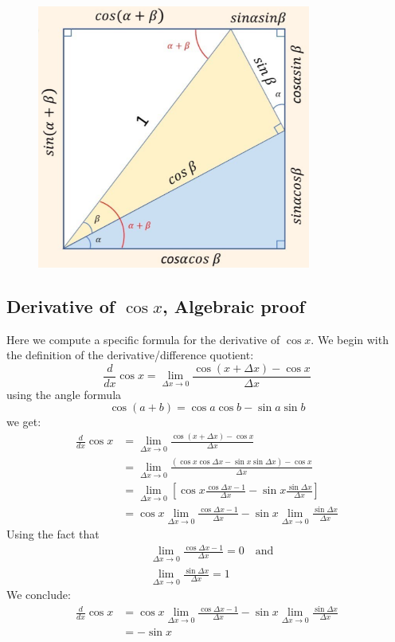 \documentclass{report}
\begin{document}
\begin{figure}[h]
\includegraphics[width=9cm]{Capture6}
\centering
\end{figure}
\newpage

\subsection{Derivative of $\cos x$, Algebraic proof} %
Here we compute a specific formula for the derivative of $\cos x$. We begin with the
definition of the derivative/difference quotient:
\begin{equation*}
\frac{d}{dx}\cos x=\lim_{\Delta x\to 0}\frac{\cos(x+\Delta x)-\cos x}{\Delta x}
\end{equation*}
using the angle formula
\begin{equation*}
\cos(a+b)=\cos a\cos b-\sin a\sin b
\end{equation*}
we get:
\begin{align*}
\frac{d}{dx}\cos x&=\lim_{\Delta x\to 0}\frac{\cos(x+\Delta x)-\cos x}{\Delta x}\\
&=\lim_{\Delta x\to 0}\frac{(\cos x\cos\Delta x-\sin x\sin\Delta x)-\cos x}{\Delta x}\\
&=\lim_{\Delta x\to 0}\left[\cos x\frac{\cos\Delta x-1}{\Delta x}
-\sin x\frac{\sin\Delta x}{\Delta x}\right]\\
&=\cos x\lim_{\Delta x\to 0}\frac{\cos\Delta x-1}{\Delta x}
-\sin x\lim_{\Delta x\to 0}\frac{\sin\Delta x}{\Delta x}
\end{align*}
Using the fact that
\begin{align*}
&\lim_{\Delta x\to 0}\frac{\cos\Delta x-1}{\Delta x}=0\quad\text{and}\\
&\lim_{\Delta x\to 0}\frac{\sin\Delta x}{\Delta x}=1
\end{align*}
We conclude:
\begin{align*}
\frac{d}{dx}\cos x&=\cos x\lim_{\Delta x\to 0}\frac{\cos\Delta x-1}{\Delta x}
-\sin x\lim_{\Delta x\to 0}\frac{\sin\Delta x}{\Delta x}\\
&=-\sin x
\end{align*}
\newpage
\end{document}
